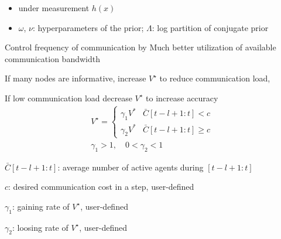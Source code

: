 \documentclass[t, mathserif]{beamer}
\begin{document}
\begin{frame}
\begin{tcolorbox}[width=.24\textwidth,equal height group=B,adjusted title={Exponential Family and Conjugate Prior}]
\begin{itemize}
		\bii
			\item under measurement $h(x)$
			\item $\omega$, $\nu$: hyperparameters of the prior; $\Lambda$: log partition of conjugate prior
		\ei
\end{itemize}
\end{tcolorbox}
\begin{tcolorbox}[width=.25\textwidth,equal height group=B,adjusted title=Adaptive VoI Realized Distributed Sensing (A-VoIDS)]
\bi
\item Control frequency of communication by 
\jtem Much better utilization of available communication bandwidth
\bii
\item If many nodes are informative, increase $V^{\star}$  to reduce communication load, 
\item If low communication
    load decrease $V^{\star}$ to increase accuracy
\ei
   	$$\begin{array}{l}
 		{V^{\star}} = \left\{ \begin{array}{*{20}{l}}
 		{\gamma _1 V^*} & {\bar{C}[t - l + 1:t] < c}\\
 		{\gamma _2{V^*}} & {\bar{C}[t - l + 1:t] \ge c}	\end{array} \right.\\
 		\gamma _1 > 1, \quad 0< \gamma _2 < 1
 	\end{array}	$$
        \bii
    	\item $\bar{C}[t - l + 1:t]$: average number of active agents during $[t-l+1:t]$
    	\item $c$: desired communication cost in a step, user-defined
    	\item $\gamma _1$: gaining rate of $V^{\star}$, user-defined
    	\item $\gamma _2$: loosing rate of $V^{\star}$, user-defined
    \ei
\ei
\end{tcolorbox}\\[2ex]


\end{frame}
\end{document}
